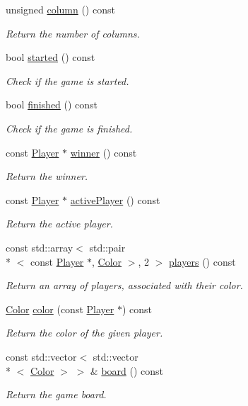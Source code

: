 \begin{DoxyCompactItemize}
unsigned \hyperlink{classConnectN_a40cc2c86197b7502276490ec1399b0b4}{column} () const 
\begin{DoxyCompactList}\small\item\em Return the number of columns. \end{DoxyCompactList}\item 
bool \hyperlink{classConnectN_a52e76a27a6ae77edcf65a24c67cfe83a}{started} () const 
\begin{DoxyCompactList}\small\item\em Check if the game is started. \end{DoxyCompactList}\item 
bool \hyperlink{classConnectN_aea9a731ecfed4ec40af668de60b8b311}{finished} () const 
\begin{DoxyCompactList}\small\item\em Check if the game is finished. \end{DoxyCompactList}\item 
const \hyperlink{classPlayer}{Player} $\ast$ \hyperlink{classConnectN_a234490fe29ede9056f1fadc4dddd087b}{winner} () const 
\begin{DoxyCompactList}\small\item\em Return the winner. \end{DoxyCompactList}\item 
const \hyperlink{classPlayer}{Player} $\ast$ \hyperlink{classConnectN_abaedcab14c58c5fc5621f76a271a7744}{active\+Player} () const 
\begin{DoxyCompactList}\small\item\em Return the active player. \end{DoxyCompactList}\item 
const std\+::array$<$ std\+::pair\\*
$<$ const \hyperlink{classPlayer}{Player} $\ast$, \hyperlink{Color_8h_ab87bacfdad76e61b9412d7124be44c1c}{Color} $>$, 2 $>$ \hyperlink{classConnectN_af9520dc89721a2702c8f6747d3711c44}{players} () const 
\begin{DoxyCompactList}\small\item\em Return an array of players, associated with their color. \end{DoxyCompactList}\item 
\hyperlink{Color_8h_ab87bacfdad76e61b9412d7124be44c1c}{Color} \hyperlink{classConnectN_a1f044297c006496edb2fe9f2cdc61f2d}{color} (const \hyperlink{classPlayer}{Player} $\ast$) const 
\begin{DoxyCompactList}\small\item\em Return the color of the given player. \end{DoxyCompactList}\item 
const std\+::vector$<$ std\+::vector\\*
$<$ \hyperlink{Color_8h_ab87bacfdad76e61b9412d7124be44c1c}{Color} $>$ $>$ \& \hyperlink{classConnectN_adc7bac377c8a1ff4976a424bdf6627c8}{board} () const 
\begin{DoxyCompactList}\small\item\em Return the game board. \end{DoxyCompactList}\end{DoxyCompactItemize}
